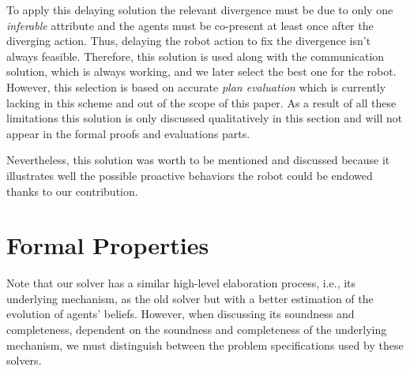 \documentclass[letterpaper]{article} %
\begin{document}






To apply this delaying solution the relevant divergence must be due to only one \textit{inferable} attribute and the agents must be co-present at least once after the diverging action. Thus, delaying the robot action to fix the divergence isn't always feasible. Therefore, this solution is used along with the communication solution, which is always working, and we later select the best one for the robot. However, this selection is based on accurate \textit{plan evaluation} which is currently lacking in this scheme and out of the scope of this paper.
As a result of all these limitations this solution is only discussed qualitatively in this section and will not appear in the formal proofs and evaluations parts. 

Nevertheless, this solution was worth to be mentioned and discussed because it illustrates well the possible proactive behaviors the robot could be endowed thanks to our contribution.




\section{Formal Properties}
Note that our solver has a similar high-level elaboration process, i.e., its underlying mechanism, as the old solver but with a better estimation of the evolution of agents' beliefs.  
However, when discussing its soundness and completeness, dependent on the soundness and completeness of the underlying mechanism, we must distinguish between the problem specifications used by these solvers. 
\end{document}
